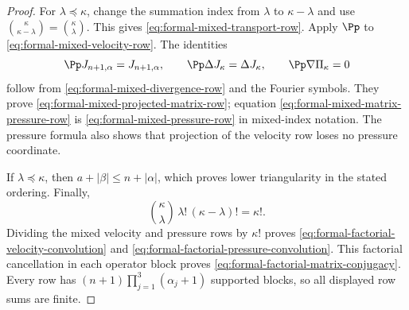 \begin{proof}
For \(\lambda\preceq\kappa\), change the summation index from \(\lambda\)
to \(\kappa-\lambda\) and use
\(\binom\kappa{\kappa-\lambda}=\binom\kappa\lambda\).  This gives
\eqref{eq:formal-mixed-transport-row}.  Apply \(\Pp\) to
\eqref{eq:formal-mixed-velocity-row}.  The identities
\[
 \Pp J_{n+1,\alpha}=J_{n+1,\alpha},
 \qquad
 \Pp\Delta J_\kappa=\Delta J_\kappa,
 \qquad
 \Pp\nabla\Pi_\kappa=0
\]
follow from \eqref{eq:formal-mixed-divergence-row} and the Fourier symbols.
They prove \eqref{eq:formal-mixed-projected-matrix-row}; equation
\eqref{eq:formal-mixed-matrix-pressure-row} is
\eqref{eq:formal-mixed-pressure-row} in mixed-index notation.  The pressure
formula also shows that projection of the velocity row loses no pressure
coordinate.

If \(\lambda\preceq\kappa\), then
\(a+|\beta|\le n+|\alpha|\), which proves lower triangularity in the stated
ordering.  Finally,
\[
 \binom\kappa\lambda\,\lambda!\,(\kappa-\lambda)!=\kappa!.
\]
Dividing the mixed velocity and pressure rows by \(\kappa!\) proves
\eqref{eq:formal-factorial-velocity-convolution} and
\eqref{eq:formal-factorial-pressure-convolution}.  This factorial cancellation in each operator block proves
\eqref{eq:formal-factorial-matrix-conjugacy}.  Every row has
\((n+1)\prod_{j=1}^3(\alpha_j+1)\) supported blocks, so all displayed row
sums are finite.
\end{proof}

